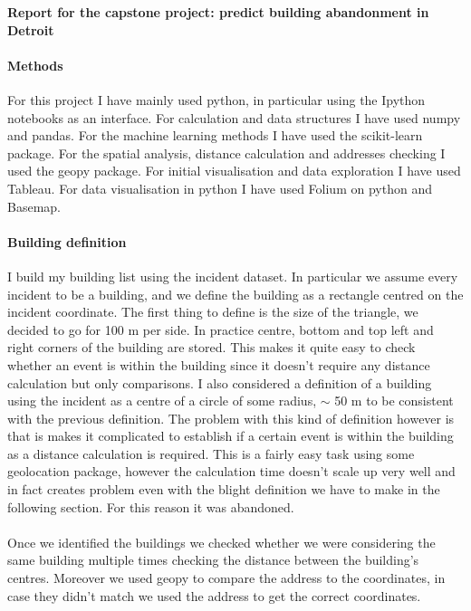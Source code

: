\documentclass[a4paper,12pt]{article}
\begin{document}
\begin{center}
\textbf{Report for the capstone project: predict building abandonment in Detroit}
\end{center}

\paragraph{Methods}
For this project I have mainly used python, in particular using the Ipython notebooks as an interface. For calculation and data structures I have used numpy and pandas. For the machine learning methods I have used the scikit-learn package. For the spatial analysis, distance calculation and addresses checking I used the geopy package. For initial visualisation and data exploration I have used Tableau. For data visualisation in python I have used Folium on python and Basemap.

\paragraph{Building definition}
I build my building list using the incident dataset. In particular we assume every incident to be a building, and we define the building as a rectangle centred on the incident coordinate. The first thing to define is the size of the triangle, we decided to go for 100 m per side. In practice centre, bottom and top left and right corners of the building are stored. This makes it quite easy to check whether an event is within the building since it doesn't require any distance calculation but only comparisons. I also considered a definition of a building using the incident as a centre of a circle of some radius, $\sim$ 50 m to be consistent with the previous definition. The problem with this kind of definition however is that is makes it complicated to establish if a certain event is within the building as a distance calculation is required. This is a fairly easy task using some geolocation package, however the calculation time doesn't scale up very well and in fact creates problem even with the blight definition we have to make in the following section. For this reason it was abandoned.\\
\\
Once we identified the buildings we checked whether we were considering the same building multiple times checking the distance between the building's centres. Moreover we used geopy to compare the address to the coordinates, in case they didn't match we used the address to get the correct coordinates.\\
\\
\end{document}
